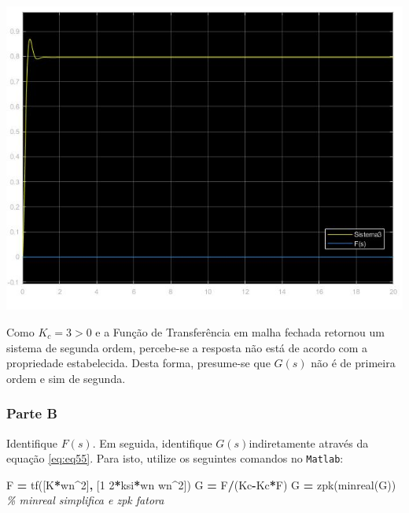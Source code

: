 \documentclass[
]{book}
\newenvironment{Shaded}{\begin{snugshade}}{\end{snugshade}}
\newcommand{\CommentTok}[1]{\textcolor[rgb]{0.56,0.35,0.01}{\textit{#1}}}
\newcommand{\FloatTok}[1]{\textcolor[rgb]{0.00,0.00,0.81}{#1}}
\newcommand{\NormalTok}[1]{#1}
\newcommand{\OperatorTok}[1]{\textcolor[rgb]{0.81,0.36,0.00}{\textbf{#1}}}
\newcommand{\VariableTok}[1]{\textcolor[rgb]{0.00,0.00,0.00}{#1}}
\begin{document}
\includegraphics{Imagens/Lab3/Resolução/prob3AC.jpg}

Como \(K_c = 3 > 0\) e a Função de Transferência em malha fechada retornou um sistema de segunda ordem, percebe-se a resposta não está de acordo com a propriedade estabelecida. Desta forma, presume-se que \(G(s)\) não é de primeira ordem e sim de segunda.

\hypertarget{parte-b}{%
\subsubsection*{Parte B}\label{parte-b}}

Identifique \(F(s)\). Em seguida, identifique \(G(s)\)indiretamente através da equação \eqref{eq:eq55}. Para isto, utilize os seguintes comandos no \texttt{Matlab}:

\begin{Shaded}
\begin{Highlighting}[]
\VariableTok{F} \OperatorTok{=} \VariableTok{tf}\NormalTok{([}\VariableTok{K}\OperatorTok{*}\VariableTok{wn}\OperatorTok{\^{}}\FloatTok{2}\NormalTok{]}\OperatorTok{,}\NormalTok{ [}\FloatTok{1} \FloatTok{2}\OperatorTok{*}\VariableTok{ksi}\OperatorTok{*}\VariableTok{wn} \VariableTok{wn}\OperatorTok{\^{}}\FloatTok{2}\NormalTok{])}
\VariableTok{G} \OperatorTok{=} \VariableTok{F}\OperatorTok{/}\NormalTok{(}\VariableTok{Kc}\OperatorTok{{-}}\VariableTok{Kc}\OperatorTok{*}\VariableTok{F}\NormalTok{)}
\VariableTok{G} \OperatorTok{=} \VariableTok{zpk}\NormalTok{(}\VariableTok{minreal}\NormalTok{(}\VariableTok{G}\NormalTok{)) }\CommentTok{\% minreal simplifica e zpk fatora}
\end{Highlighting}
\end{Shaded}
\end{document}

